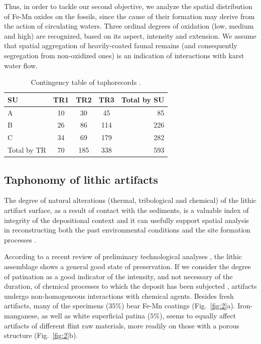 \documentclass[review,authoryear]{elsarticle} %
\begin{document}
Thus, in order to tackle our second objective, we analyze the spatial distribution of Fe-Mn oxides on the fossils, since the cause of their formation may derive from the action of circulating waters. Three ordinal degrees of oxidation (low, medium and high) are recognized, based on its aspect, intensity and extension. We assume that spatial aggregation of heavily-coated faunal remains (and consequently segregation from non-oxidized ones) is an indication of interactions with karst water flow.

\begin{table}
  \caption{Contingency table of taphorecords \citep[reproduced from][]{Bagnus2011}.}
  \label{tab:1}
  \vspace{0.1in}
  \centering
  \begin{tabular}{l c c c r}
    \hline
    SU & TR1 & TR2 & TR3 & Total by SU \\
    \hline
    A & 10 & 30 & 45 & 85 \\
    B & 26 & 86 & 114 & 226 \\
    C & 34 & 69 & 179 & 282 \\
    Total by TR & 70 & 185 & 338 & 593 \\
    \hline
  \end{tabular}
\end{table}
  
\subsection{Taphonomy of lithic artifacts}

The degree of natural alterations (thermal, tribological and chemical) of the lithic artifact surface, as a result of contact with the sediments, is a valuable index of integrity of the depositional context and it can usefully support spatial analysis in reconstructing both the past environmental conditions and the site formation processes \citep{Burroni2002}.

According to a recent review of preliminary technological analyses \citep{Arzarello2012,Arzarello2015}, the lithic assemblage shows a general good state of preservation. If we consider the degree of patination as a good indicator of the intensity, and not necessary of the duration, of chemical processes to which the deposit has been subjected \citep{Burroni2002}, artifacts undergo non-homogeneous interactions with chemical agents. Besides fresh artifacts, many of the specimens ($35\%$) bear Fe-Mn coatings (Fig.~\ref{fig:2}a). Iron-manganese, as well as white superficial patina ($5\%$), seems to equally affect artifacts of different flint raw materials, more readily on those with a porous structure (Fig.~\ref{fig:2}b).
\end{document}
